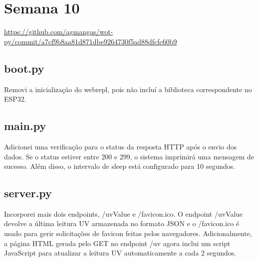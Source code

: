 
\section{Semana 10}

\url{https://github.com/agmangas/wot-py/commit/a7cf9b8aa81d871dbe9264730f5ad88dfcfc60b9}

\subsection{boot.py}

Removi a inicialização do webrepl, pois não incluí a biblioteca correspondente no ESP32.

\subsection{main.py}

Adicionei uma verificação para o status da resposta HTTP após o envio dos dados. Se o status estiver entre 200 e 299, o sistema imprimirá uma mensagem de sucesso. Além disso, o intervalo de sleep está configurado para 10 segundos.

\subsection{server.py}

Incorporei mais dois endpoints, /uvValue e /favicon.ico. O endpoint /uvValue devolve a última leitura UV armazenada no formato JSON e o /favicon.ico é usado para gerir solicitações de favicon feitas pelos navegadores. Adicionalmente, a página HTML gerada pelo GET no endpoint /uv agora inclui um script JavaScript para atualizar a leitura UV automaticamente a cada 2 segundos.
